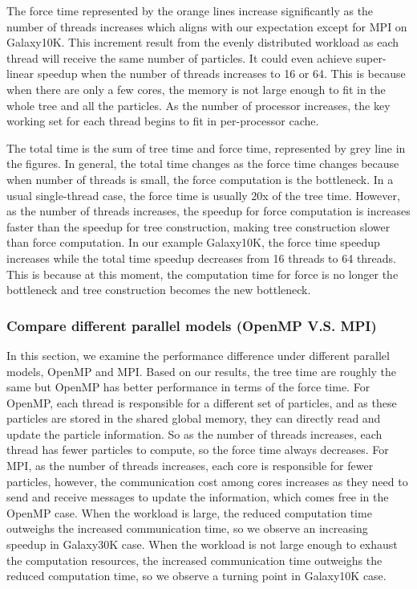 \documentclass{article}
\begin{document}
The force time represented by the orange lines increase significantly as the number of threads increases which aligns with our expectation except for MPI on Galaxy10K. This increment result from the evenly distributed workload as each thread will receive the same number of particles. 
It could even achieve super-linear speedup when the number of threads increases to 16 or 64. This is because when there are only a few cores, the memory is not large enough to fit in the whole tree and all the particles. As the number of processor increases, the key working set for each thread begins to fit in per-processor cache.

The total time is the sum of tree time and force time, represented by grey line in the figures. In general, the total time changes as the force time changes because when number of threads is small, the force computation is the bottleneck. In a usual single-thread case, the force time is usually 20x of the tree time. However, as the number of threads increases, the speedup for force computation is increases faster than the speedup for tree construction, making tree construction slower than force computation. In our example Galaxy10K, the force time speedup increases while the total time speedup decreases from 16 threads to 64 threads. This is because at this moment, the computation time for force is no longer the bottleneck and tree construction becomes the new bottleneck.

\subsubsection{Compare different parallel models (OpenMP V.S. MPI)}
In this section, we examine the performance difference under different parallel models, OpenMP and MPI. Based on our results, the tree time are roughly the same but OpenMP has better performance in terms of the force time. For OpenMP, each thread is responsible for a different set of particles, and as these particles are stored in the shared global memory, they can directly read and update the particle information. So as the number of threads increases, each thread has fewer particles to compute, so the force time always decreases. For MPI, as the number of threads increases, each core is responsible for fewer particles, however, the communication cost among cores increases as they need to send and receive messages to update the information, which comes free in the OpenMP case. When the workload is large, the reduced computation time outweighs the increased communication time, so we observe an increasing speedup in Galaxy30K case. When the workload is not large enough to exhaust the computation resources, the increased communication time outweighs the reduced computation time, so we observe a turning point in Galaxy10K case.
\end{document}
